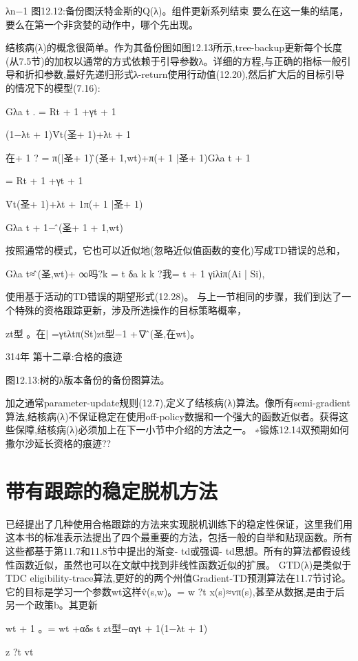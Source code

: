 λn−1
图12.12:备份图沃特金斯的Q(λ)。组件更新系列结束
要么在这一集的结尾，要么在第一个非贪婪的动作中，哪个先出现。


结核病(λ)的概念很简单。作为其备份图如图12.13所示,tree-backup更新每个长度(从7.5节)的加权以通常的方式依赖于引导参数λ。详细的方程,与正确的指标一般引导和折扣参数,最好先递归形式λ-return使用行动值(12.20),然后扩大后的目标引导的情况下的模型(7.16):

Gλa t
.
= Rt + 1 +γt + 1

(1−λt + 1)V̄t(圣+ 1)+λt + 1

在+ 1 ? =
π(|圣+ 1)问̂(圣+ 1,wt)+π(+ 1 |圣+ 1)Gλa t + 1


= Rt + 1 +γt + 1

V̄t(圣+ 1)+λt + 1π(+ 1 |圣+ 1)

Gλa t + 1−问̂(圣+ 1 + 1,wt)

按照通常的模式，它也可以近似地(忽略近似值函数的变化)写成TD错误的总和，

Gλa t≈问̂(圣,wt)+
∞吗?k = t
δa k
k ?我= t + 1
γiλiπ(Ai | Si),

使用基于活动的TD错误的期望形式(12.28)。
与上一节相同的步骤，我们到达了一个特殊的资格跟踪更新，涉及所选操作的目标策略概率，

zt型
。在| =γtλtπ(St)zt型−1 +∇问̂(圣,在wt)。

314年 					第十二章:合格的痕迹
 

图12.13:树的λ版本备份的备份图算法。

加之通常parameter-update规则(12.7),定义了结核病(λ)算法。像所有semi-gradient算法,结核病(λ)不保证稳定在使用off-policy数据和一个强大的函数近似者。获得这些保障,结核病(λ)必须加上在下一小节中介绍的方法之一。
∗锻炼12.14双预期如何撒尔沙延长资格的痕迹??

\section{带有跟踪的稳定脱机方法}

已经提出了几种使用合格跟踪的方法来实现脱机训练下的稳定性保证，这里我们用这本书的标准表示法提出了四个最重要的方法，包括一般的自举和贴现函数。所有这些都基于第11.7和11.8节中提出的渐变- td或强调- td思想。所有的算法都假设线性函数近似，虽然也可以在文献中找到非线性函数近似的扩展。
GTD(λ)是类似于TDC eligibility-trace算法,更好的的两个州值Gradient-TD预测算法在11.7节讨论。它的目标是学习一个参数wt这样v̂(s,w)。= w ?t x(s)≈vπ(s),甚至从数据,是由于后另一个政策b。其更新


wt + 1
。= wt +αδs t zt型−αγt + 1(1−λt + 1)

z ?t vt

